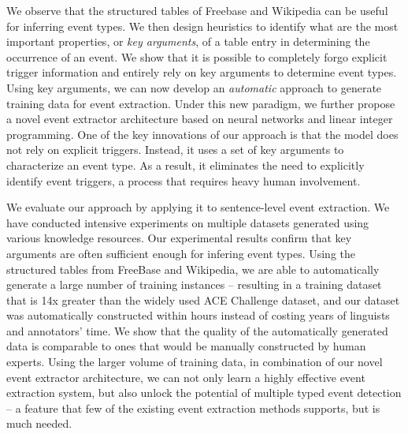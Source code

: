 We observe that the structured tables of Freebase and Wikipedia can be useful for inferring event types. We then design heuristics to
identify what are the most important properties, or \emph{key arguments},  of a table entry in determining the occurrence of an event. We
show that it is possible to completely forgo explicit trigger information and entirely rely on key arguments to determine event types.
Using key arguments, we can now develop an \emph{automatic} approach to generate training data for event extraction. Under this new \DS
paradigm, we further propose a novel event extractor architecture based on neural networks and linear integer programming. One of the key
innovations of our approach is that the model does not rely on explicit triggers. Instead, it uses a set of key arguments to characterize
an event type. As a result, it eliminates the need to explicitly identify event triggers, a process that requires heavy human involvement.

We evaluate our approach by applying it to sentence-level event extraction. We have conducted intensive experiments on multiple datasets
generated using various knowledge resources. Our experimental results confirm that key arguments are often sufficient enough for infering
event types. 
Using the structured tables from FreeBase and Wikipedia, we are able to automatically generate a large number of training
instances -- resulting in a training dataset that is 14x greater than the widely used ACE Challenge dataset\cite{doddington2004automatic}, and our dataset was automatically constructed within hours instead of costing years of linguists and annotators' time. We show that the quality of the automatically
generated data is comparable to ones that would be manually constructed by human experts. Using the larger volume of training data, in
combination of our novel event extractor architecture, we can not only learn a highly effective event extraction system, but also unlock
the potential of multiple typed event detection -- a feature that few of the existing event extraction methods supports, but is much needed.


